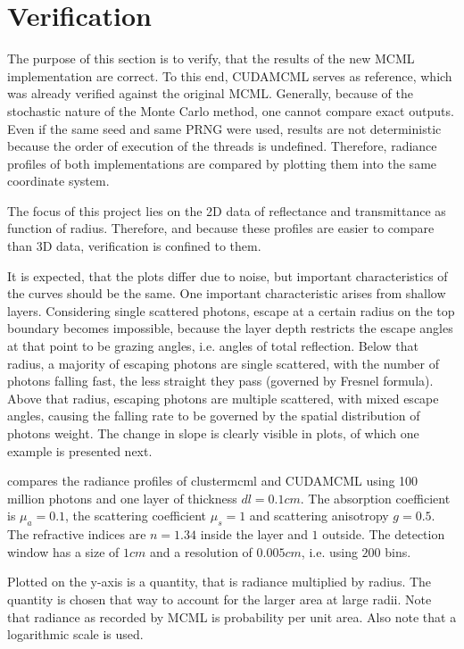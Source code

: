 \documentclass[]{article}
\begin{document}
\section{Verification}

The purpose of this section is to verify, that the results of the new MCML implementation are correct. To this end, CUDAMCML serves as reference, which was already verified against the original MCML. Generally, because of the stochastic nature of the Monte Carlo method, one cannot compare exact outputs. Even if the same seed and same PRNG were used, results are not deterministic because the order of execution of the threads is undefined. Therefore, radiance profiles of both implementations are compared by plotting them into the same coordinate system.

The focus of this project lies on the 2D data of reflectance and transmittance as function of radius. Therefore, and because these profiles are easier to compare than 3D data, verification is confined to them.

It is expected, that the plots differ due to noise, but important characteristics of the curves should be the same. One important characteristic arises from shallow layers. Considering single scattered photons, escape at a certain radius on the top boundary becomes impossible, because the layer depth restricts the escape angles at that point to be grazing angles, i.e. angles of total reflection. Below that radius, a majority of escaping photons are single scattered, with the number of photons falling fast, the less straight they pass (governed by Fresnel formula). Above that radius, escaping photons are multiple scattered, with mixed escape angles, causing the falling rate to be governed by the spatial distribution of photons weight. The change in slope is clearly visible in plots, of which one example is presented next.

 compares the radiance profiles of clustermcml and CUDAMCML using 100 million photons and one layer of thickness $dl=0.1cm$. The absorption coefficient is $\mu_a=0.1$, the scattering coefficient $\mu_s=1$ and scattering anisotropy $g=0.5$. The refractive indices are $n=1.34$ inside the layer and $1$ outside. The detection window has a size of $1cm$ and a resolution of $0.005cm$, i.e. using $200$ bins.

Plotted on the y-axis is a quantity, that is radiance multiplied by radius. The quantity is chosen that way to account for the larger area at large radii. Note that radiance as recorded by MCML is probability per unit area. Also note that a logarithmic scale is used.
\end{document}
